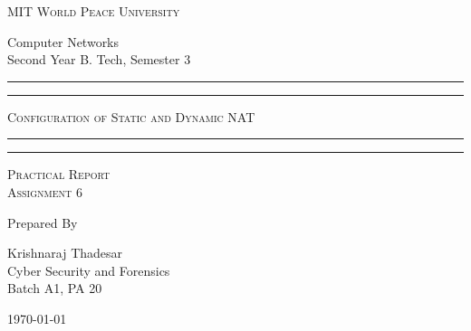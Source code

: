 \documentclass[11pt]{article}
\begin{document}
	
	\begin{titlepage} 
		\centering 
		
		
		\huge\textsc{
			MIT World Peace University
		}\\
	
		\vspace{0.75\baselineskip} %
		
		\LARGE{
			Computer Networks\\
			Second Year B. Tech, Semester 3
		}
		
		\vfill %
		
		
		\rule{\textwidth}{1.6pt}\vspace*{-\baselineskip}\vspace*{2pt}
		\rule{\textwidth}{0.6pt}
		\vspace{0.75\baselineskip} %
		
		
		
		\huge{\textsc{
			Configuration of Static and Dynamic NAT
			}} \\
		
		
		
		\vspace{0.5\baselineskip} %
		\rule{\textwidth}{0.6pt}\vspace*{-\baselineskip}\vspace*{2.8pt}
		\rule{\textwidth}{1.6pt}
		
		\vspace{1\baselineskip} %

			
		\LARGE\textsc{
			Practical Report\\
			Assignment 6
		} %
		\vfill
		
		
		Prepared By
		\vspace{0.5\baselineskip} %
		
		\Large{
			Krishnaraj Thadesar \\
			Cyber Security and Forensics\\
			Batch A1, PA 20
		}
		
		
		\vspace{0.5\baselineskip} %
		\today

	\end{titlepage}
	
\end{document}
